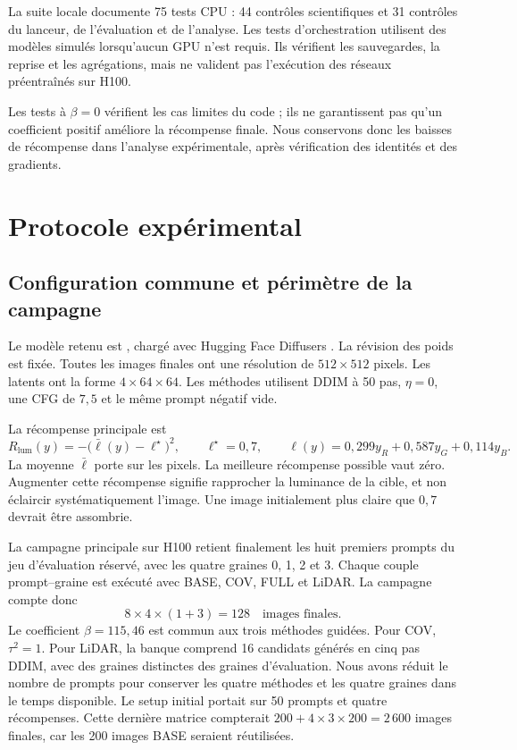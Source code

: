 \documentclass[11pt,a4paper]{article}
\newcommand{\code}[1]{\texttt{\detokenize{#1}}}
\begin{document}
La suite locale documente 75 tests CPU : 44 contrôles scientifiques et 31 contrôles du lanceur, de l'évaluation et de l'analyse. Les tests d'orchestration utilisent des modèles simulés lorsqu'aucun GPU n'est requis. Ils vérifient les sauvegardes, la reprise et les agrégations, mais ne valident pas l'exécution des réseaux préentraînés sur H100.

Les tests à $\beta=0$ vérifient les cas limites du code ; ils ne garantissent pas qu'un coefficient positif améliore la récompense finale. Nous conservons donc les baisses de récompense dans l'analyse expérimentale, après vérification des identités et des gradients.

\section{Protocole expérimental}
\subsection{Configuration commune et périmètre de la campagne}
Le modèle retenu est \code{stable-diffusion-v1-5/stable-diffusion-v1-5}, chargé avec Hugging Face Diffusers \cite{ldm}. La révision des poids est fixée. Toutes les images finales ont une résolution de $512\times512$ pixels. Les latents ont la forme $4\times64\times64$. Les méthodes utilisent DDIM à 50 pas, $\eta=0$, une CFG de $7{,}5$ et le même prompt négatif vide.

La récompense principale est
\begin{equation}\label{eq:luminance}
R_{\mathrm{lum}}(y)=-\bigl(\bar\ell(y)-\ell^\star\bigr)^2,
\qquad \ell^\star=0{,}7,
\qquad \ell(y)=0{,}299y_R+0{,}587y_G+0{,}114y_B.
\end{equation}
La moyenne $\bar\ell$ porte sur les pixels. La meilleure récompense possible vaut zéro. Augmenter cette récompense signifie rapprocher la luminance de la cible, et non éclaircir systématiquement l'image. Une image initialement plus claire que $0{,}7$ devrait être assombrie.

La campagne principale sur H100 retient finalement les huit premiers prompts du jeu d'évaluation réservé, avec les quatre graines 0, 1, 2 et 3. Chaque couple prompt--graine est exécuté avec BASE, COV, FULL et LiDAR. La campagne compte donc
\begin{equation}
8\times4\times(1+3)=128\quad\text{images finales}.
\end{equation}
Le coefficient $\beta=115{,}46$ est commun aux trois méthodes guidées. Pour COV, $\tau^2=1$. Pour LiDAR, la banque comprend 16 candidats générés en cinq pas DDIM, avec des graines distinctes des graines d'évaluation. Nous avons réduit le nombre de prompts pour conserver les quatre méthodes et les quatre graines dans le temps disponible. Le setup initial portait sur 50 prompts et quatre récompenses. Cette dernière matrice compterait $200+4\times3\times200=2\,600$ images finales, car les 200 images BASE seraient réutilisées.
\end{document}
